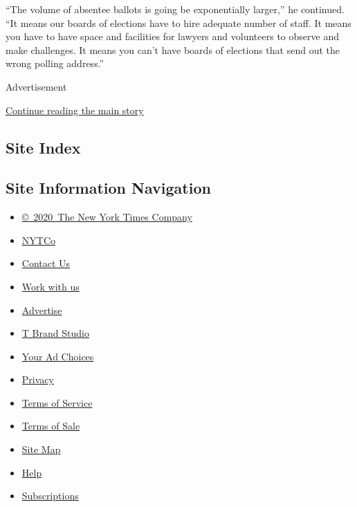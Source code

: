 ``The volume of absentee ballots is going be exponentially larger,'' he
continued. ``It means our boards of elections have to hire adequate
number of staff. It means you have to have space and facilities for
lawyers and volunteers to observe and make challenges. It means you
can't have boards of elections that send out the wrong polling
address.''

Advertisement

\protect\hyperlink{after-bottom}{Continue reading the main story}

\hypertarget{site-index}{%
\subsection{Site Index}\label{site-index}}

\hypertarget{site-information-navigation}{%
\subsection{Site Information
Navigation}\label{site-information-navigation}}

\begin{itemize}
\tightlist
\item
  \href{https://help.nytimes3xbfgragh.onion/hc/en-us/articles/115014792127-Copyright-notice}{©~2020~The
  New York Times Company}
\end{itemize}

\begin{itemize}
\tightlist
\item
  \href{https://www.nytco.com/}{NYTCo}
\item
  \href{https://help.nytimes3xbfgragh.onion/hc/en-us/articles/115015385887-Contact-Us}{Contact
  Us}
\item
  \href{https://www.nytco.com/careers/}{Work with us}
\item
  \href{https://nytmediakit.com/}{Advertise}
\item
  \href{http://www.tbrandstudio.com/}{T Brand Studio}
\item
  \href{https://www.nytimes3xbfgragh.onion/privacy/cookie-policy\#how-do-i-manage-trackers}{Your
  Ad Choices}
\item
  \href{https://www.nytimes3xbfgragh.onion/privacy}{Privacy}
\item
  \href{https://help.nytimes3xbfgragh.onion/hc/en-us/articles/115014893428-Terms-of-service}{Terms
  of Service}
\item
  \href{https://help.nytimes3xbfgragh.onion/hc/en-us/articles/115014893968-Terms-of-sale}{Terms
  of Sale}
\item
  \href{https://spiderbites.nytimes3xbfgragh.onion}{Site Map}
\item
  \href{https://help.nytimes3xbfgragh.onion/hc/en-us}{Help}
\item
  \href{https://www.nytimes3xbfgragh.onion/subscription?campaignId=37WXW}{Subscriptions}
\end{itemize}
